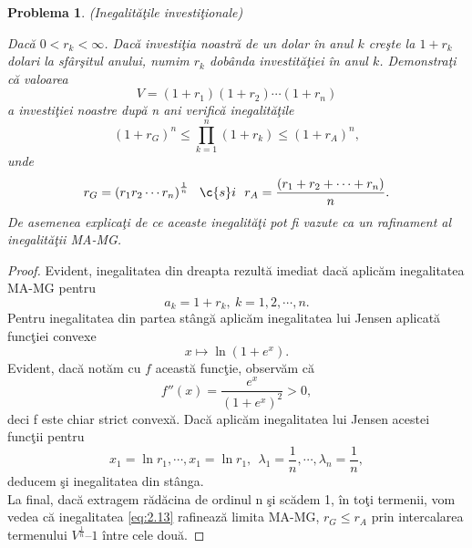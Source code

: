 \documentclass[a4paper,12pt,oneside]{report}
\newtheorem{problem}{Problema}
\begin{document}
\begin{problem} (Inegalit\u{a}\c{t}ile investi\c{t}ionale)

Dac\u{a} \(0< r_{k} < \infty\). Dac\u{a} investi\c{t}ia noastr\u{a} de un dolar \^{i}n anul \(k\) cre\c{s}te la \(1 +  r_{k}\) dolari la sf\^{a}r\c{s}itul anului, numim \(r_{k}\) dob\^{a}nda investit\u{a}\c{t}iei \^{i}n anul \(k\). Demonstra\c{t}i c\u{a} valoarea
\begin{displaymath}
  V = \left ( 1 + r_{1} \right )\left ( 1 + r_{2} \right )\cdots \left ( 1 + r_{n} \right )
\end{displaymath}
a investi\c{t}iei noastre dup\u{a} n ani verific\u{a} inegalit\u{a}\c{t}ile
\begin{displaymath}
  \left ( 1 + r_{G} \right )^{n} \leq \prod_{k = 1}^{n} \left ( 1 + r_{k} \right )\leq \left ( 1 + r_{A} \right )^{n}, \label{eq:2.13} \tag{2.13}
\end{displaymath}
unde
\begin{displaymath}
  r_{G} = \left ( r_{1}r_{2} \cdots r_{n}\right )^{\frac{1}{n}}~~ \c{s}i~~ r_{A} = \frac{\left ( r_{1} + r_{2} +  \cdots+ r_{n}\right )}{n}.
\end{displaymath}
De asemenea explica\c{t}i de ce aceaste inegalit\u{a}\c{t}i  pot fi vazute ca un rafinament al inegalit\u{a}\c{t}ii MA-MG.
\end{problem}
\begin{proof}
Evident, inegalitatea din dreapta rezult\u{a} imediat dac\u{a} aplic\u{a}m inegalitatea MA-MG pentru
\begin{displaymath}
  a_{k} = 1 + r_{k},~ k =1,2,\cdots, n.
\end{displaymath}
Pentru inegalitatea din partea st\^{a}ng\u{a} aplic\u{a}m inegalitatea lui Jensen aplicat\u{a} func\c{t}iei convexe
\[x \mapsto \ln\left ( 1 + e^{x} \right ).\]
Evident, dac\u{a} not\u{a}m cu $f$ aceast\u{a} func\c{t}ie, observ\u{a}m c\u{a}
\[
f''(x)=\frac{e^x}{(1+e^x)^2}>0,
\]
deci f este chiar strict convex\u{a}. Dac\u{a} aplic\u{a}m inegalitatea lui Jensen acestei func\c{t}ii pentru
\[
x_1=\ln r_1,\cdots, x_1=\ln r_1,~~\lambda_1=\frac{1}{n},\cdots, \lambda_n=\frac{1}{n},
\]
deducem \c{s}i inegalitatea din st\^{a}nga.\\
La final, dac\u{a} extragem r\u{a}d\u{a}cina de ordinul n \c{s}i sc\u{a}dem 1, \^{i}n to\c{t}i termenii, vom vedea c\u{a} inegalitatea \ref{eq:2.13} rafineaz\u{a} limita MA-MG,  \(r_{G} \leq r_{A}\) prin intercalarea termenului \(V^{\frac{1}{n}} – 1\) \^{i}ntre cele dou\u{a}.
\end{proof}
\end{document}
